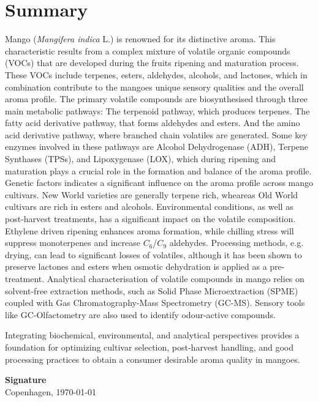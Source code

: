 \section*{Summary}
Mango (\textit{Mangifera indica} L.) is renowned for its distinctive aroma. This characteristic results from a complex mixture of volatile organic compounds (VOCs) that are developed during the fruits ripening and maturation process. These VOCs include terpenes, esters, aldehydes, alcohols, and lactones, which in combination contribute to the mangoes unique sensory qualities and the overall aroma profile. The primary volatile compounds are biosynthesised through three main metabolic pathways: The terpenoid pathway, which produces terpenes. The fatty acid derivative pathway, that forms aldehydes and esters. And the amino acid derivative pathway, where branched chain volatiles are generated. Some key enzymes involved in these pathways are Alcohol Dehydrogenase (ADH), Terpene Synthases (TPSs), and Lipoxygenase (LOX), which during ripening and maturation plays a crucial role in the formation and balance of the aroma profile.
Genetic factors indicates a significant influence on the aroma profile across mango cultivars. New World varieties are generally terpene rich, wheareas Old World cultivars are rich in esters and alcohols. Environmental conditions, as well as post-harvest treatments, has a significant impact on the volatile composition. Ethylene driven ripening enhances aroma formation, while chilling stress will suppress monoterpenes and increase $C_6$/$C_9$ aldehydes. Processing methods, e.g. drying, can lead to significant losses of volatiles, although it has been shown to preserve lactones and esters when osmotic dehydration is applied as a pre-treatment.
Analytical characterisation of volatile compounds in mango relies on solvent-free extraction methods, such as Solid Phase Microextraction (SPME) coupled with Gas Chromatography-Mass Spectrometry (GC-MS). Sensory tools like GC-Olfactometry are also used to identify odour-active compounds. 

\vspace{1em}
Integrating biochemical, environmental, and analytical perspectives provides a foundation for optimizing cultivar selection, post-harvest handling, and good processing practices to obtain a consumer desirable aroma quality in mangoes.



\vspace{2em}
\begin{center}
    \textbf{Signature}\\[0.5em]
    {\small Copenhagen, \today}
    \end{center}
    
